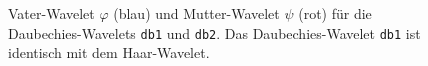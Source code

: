 \begin{figure}
\centering
{}
\caption{Vater-Wavelet $\varphi$ (blau) und Mutter-Wavelet $\psi$
(rot) für die Daubechies-Wavelets \texttt{db1} und \texttt{db2}.
Das Daubechies-Wavelet \texttt{db1} ist identisch mit dem Haar-Wavelet.
\label{buch:algo:db1}}
\end{figure}%
